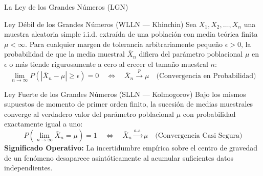 \documentclass[10pt, aspectratio=169]{beamer}
\begin{document}
\begin{frame}{La Ley de los Grandes Números (LGN)}
  \fontsize{7.5pt}{9pt}\selectfont
  \begin{block}{Ley Débil de los Grandes Números (WLLN — Khinchin)}
    \fontsize{7.5pt}{9pt}\selectfont
    Sea $X_1, X_2, \ldots, X_n$ una muestra aleatoria simple i.i.d. extraída de una población con media teórica finita $\mu < \infty$. Para cualquier margen de tolerancia arbitrariamente pequeño $\epsilon > 0$, la probabilidad de que la media muestral $\bar{X}_n$ difiera del parámetro poblacional $\mu$ en $\epsilon$ o más tiende rigurosamente a cero al crecer el tamaño muestral $n$:
    $$\lim_{n \to \infty} P(|\bar{X}_n - \mu| \ge \epsilon) = 0 \quad \iff \quad \bar{X}_n \xrightarrow{p} \mu \quad \text{(Convergencia en Probabilidad)}$$
  \end{block}
  \vspace{-0.15cm}
  \pause
  \begin{alertblock}{Ley Fuerte de los Grandes Números (SLLN — Kolmogorov)}
    \fontsize{7.5pt}{9pt}\selectfont
    Bajo los mismos supuestos de momento de primer orden finito, la sucesión de medias muestrales converge al verdadero valor del parámetro poblacional $\mu$ con probabilidad exactamente igual a uno:
    $$P\left(\lim_{n \to \infty} \bar{X}_n = \mu\right) = 1 \quad \iff \quad \bar{X}_n \xrightarrow{a.s.} \mu \quad \text{(Convergencia Casi Segura)}$$
    \textbf{Significado Operativo:} La incertidumbre empírica sobre el centro de gravedad de un fenómeno desaparece asintóticamente al acumular suficientes datos independientes.
  \end{alertblock}
\end{frame}
\end{document}
